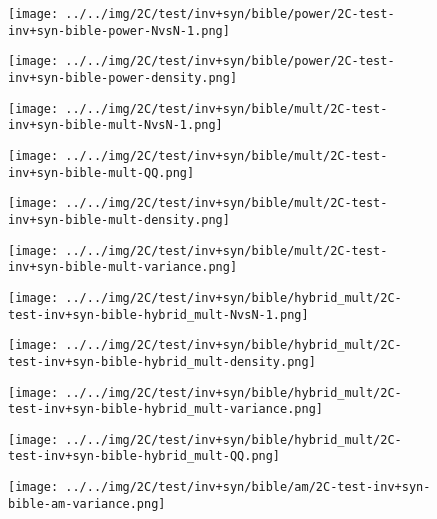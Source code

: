 \begin{figure}[H]
\centering	\texttt{[image: ../../img/2C/test/inv+syn/bible/power/2C-test-inv+syn-bible-power-NvsN-1.png]}
\end{figure}
\begin{figure}[H]
\centering	\texttt{[image: ../../img/2C/test/inv+syn/bible/power/2C-test-inv+syn-bible-power-density.png]}
\end{figure}
\begin{figure}[H]
\centering	\texttt{[image: ../../img/2C/test/inv+syn/bible/mult/2C-test-inv+syn-bible-mult-NvsN-1.png]}
\end{figure}
\begin{figure}[H]
\centering	\texttt{[image: ../../img/2C/test/inv+syn/bible/mult/2C-test-inv+syn-bible-mult-QQ.png]}
\end{figure}
\begin{figure}[H]
\centering	\texttt{[image: ../../img/2C/test/inv+syn/bible/mult/2C-test-inv+syn-bible-mult-density.png]}
\end{figure}
\begin{figure}[H]
\centering	\texttt{[image: ../../img/2C/test/inv+syn/bible/mult/2C-test-inv+syn-bible-mult-variance.png]}
\end{figure}
\begin{figure}[H]
\centering	\texttt{[image: ../../img/2C/test/inv+syn/bible/hybrid\_mult/2C-test-inv+syn-bible-hybrid\_mult-NvsN-1.png]}
\end{figure}
\begin{figure}[H]
\centering	\texttt{[image: ../../img/2C/test/inv+syn/bible/hybrid\_mult/2C-test-inv+syn-bible-hybrid\_mult-density.png]}
\end{figure}
\begin{figure}[H]
\centering	\texttt{[image: ../../img/2C/test/inv+syn/bible/hybrid\_mult/2C-test-inv+syn-bible-hybrid\_mult-variance.png]}
\end{figure}
\begin{figure}[H]
\centering	\texttt{[image: ../../img/2C/test/inv+syn/bible/hybrid\_mult/2C-test-inv+syn-bible-hybrid\_mult-QQ.png]}
\end{figure}
\begin{figure}[H]
\centering	\texttt{[image: ../../img/2C/test/inv+syn/bible/am/2C-test-inv+syn-bible-am-variance.png]}
\end{figure}
